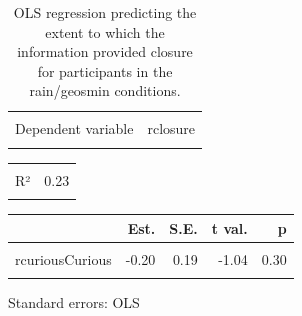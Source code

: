\documentclass[
  letterpaper,
  DIV=11,
  numbers=noendperiod]{scrartcl}
\begin{document}
\hypertarget{tbl-rclosure}{}
\begin{table}[!h]
\caption{\label{tbl-rclosure}OLS regression predicting the extent to which the information provided
closure for participants in the rain/geosmin conditions. }\tabularnewline

\centering
\begin{tabular}{lr}
\toprule
\cellcolor{gray!10}{Observations} & \cellcolor{gray!10}{237}\\
Dependent variable & rclosure\\
\cellcolor{gray!10}{Type} & \cellcolor{gray!10}{OLS linear regression}\\
\bottomrule
\end{tabular}
\end{table} \begin{table}[!h]
\centering
\begin{tabular}{lr}
\toprule
\cellcolor{gray!10}{F(2,234)} & \cellcolor{gray!10}{35.86}\\
R² & 0.23\\
\cellcolor{gray!10}{Adj. R²} & \cellcolor{gray!10}{0.23}\\
\bottomrule
\end{tabular}
\end{table} \begin{table}[!h]
\centering
\begin{threeparttable}
\begin{tabular}{lrrrr}
\toprule
  & Est. & S.E. & t val. & p\\
\midrule
\cellcolor{gray!10}{(Intercept)} & \cellcolor{gray!10}{2.58} & \cellcolor{gray!10}{0.17} & \cellcolor{gray!10}{15.47} & \cellcolor{gray!10}{0.00}\\
rcuriousCurious & -0.20 & 0.19 & -1.04 & 0.30\\
\cellcolor{gray!10}{rresoResolution} & \cellcolor{gray!10}{1.62} & \cellcolor{gray!10}{0.19} & \cellcolor{gray!10}{8.42} & \cellcolor{gray!10}{0.00}\\
\bottomrule
\end{tabular}
\begin{tablenotes}
\item Standard errors: OLS
\end{tablenotes}
\end{threeparttable}
\end{table}
\end{document}
